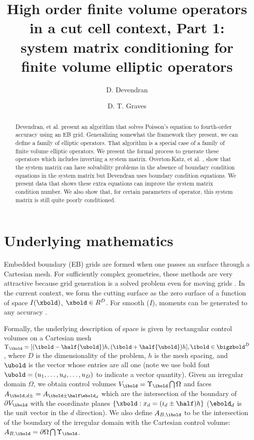 \documentclass{article}
\begin{document}
\title{High order finite volume operators in a cut cell context,
  Part 1: system  matrix conditioning for finite volume elliptic operators}
\author{
   \and D. Devendran    \footnotemark[2]
   \and D. T. Graves    \footnotemark[1]
        }

\maketitle

\begin{abstract}

Devendran, et al. \cite{Devendran2017} present an algorithm that
solves Poisson's equation to fourth-order accuracy using an EB grid.
Generalizing somewhat  the framework they present, we can define a
family of elliptic operators.   That algorithm is a special case of a
family of finite volume elliptic operators.   We present the formal
process to generate these operators which includes inverting a system
matrix.    Overton-Katz, et al. \cite{Katz2023}, show that the system
matrix can have solvability problems in the absence of boundary
condition equations in the system matrix  but Devendran uses
boundary condition equations.   We present data that shows these extra
equations can improve the system matrix condition number.
We also show that, for certain parameters of operator,
this system matrix is still quite poorly conditioned.


\end{abstract}


\section{Underlying mathematics}

Embedded boundary (EB) grids are formed when one passes an  surface
through a Cartesian mesh.    For sufficiently complex geometries, these methods
are very attractive because grid generation is a solved problem
even for moving grids \cite{MillerTrebotich2012}.
In the current context, we form the cutting surface as the zero
surface of a function  of space $I(\xbold)$, $\xbold \in R^D$.
For smooth ($I$),  moments can be generated to any
accuracy \cite{Schwartz2015}.

Formally, the underlying description of space
is given by rectangular control volumes on a Cartesian mesh
$\Upsilon_\ibold = [(\ibold-\half {\ubold})h, (\ibold+\half
{\ubold})h], \ibold \in \bigzbold^D$, where $D$ is the dimensionality
of the problem, $h$ is the mesh spacing, and ${\ubold}$ is the vector
whose entries are all one (note we use bold font $\ubold = (u_1, \dots, u_d,
\dots, u_D)$ to indicate a vector quantity).
Given an irregular domain $\Omega$, we
obtain control volumes $V_\ibold = \Upsilon_\ibold \bigcap \Omega$ and
faces $A_{\ibold,d\pm} = A_{\ibold \pm \half \ebold_d}$ which are the
intersection of the boundary of $\partial V_\ibold$ with the
coordinate planes $\{{\xbold}:x_d = (i_d \pm \half)h \}$ ($\ebold_d$ is
the unit vector in the $d$ direction).  We also
define $A_{B,\ibold}$ to be the intersection of the boundary of the
irregular domain with the Cartesian control volume: $A_{B,\ibold}
= \partial \Omega \bigcap \Upsilon_\ibold$. 
\end{document}
